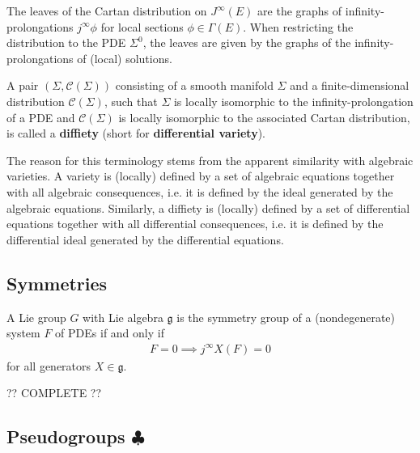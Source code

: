     \begin{property}[Diffiety]\label{var:diffiety}
        The leaves of the Cartan distribution on $J^\infty(E)$ are the graphs of infinity-prolongations $j^\infty\phi$ for local sections $\phi\in\Gamma(E)$. When restricting the distribution to the PDE $\Sigma^0$, the leaves are given by the graphs of the infinity-prolongations of (local) solutions.

        A pair $(\Sigma,\mathcal{C}(\Sigma))$ consisting of a smooth manifold $\Sigma$ and a finite-dimensional distribution $\mathcal{C}(\Sigma)$, such that $\Sigma$ is locally isomorphic to the infinity-prolongation of a PDE and $\mathcal{C}(\Sigma)$ is locally isomorphic to the associated Cartan distribution, is called a \textbf{diffiety} (short for \textbf{differential variety}).
    \end{property}
    \begin{remark}
        The reason for this terminology stems from the apparent similarity with algebraic varieties. A variety is (locally) defined by a set of algebraic equations together with all algebraic consequences, i.e. it is defined by the ideal generated by the algebraic equations. Similarly, a diffiety is (locally) defined by a set of differential equations together with all differential consequences, i.e. it is defined by the differential ideal generated by the differential equations.
    \end{remark}

\subsection{Symmetries}

    \begin{property}
        A Lie group $G$ with Lie algebra $\mathfrak{g}$ is the symmetry group of a (nondegenerate) system $F$ of PDEs if and only if
        \begin{gather}
            F=0\implies j^\infty X(F)=0
        \end{gather}
        for all generators $X\in\mathfrak{g}$.
    \end{property}

    ?? COMPLETE ??

\subsection{\texorpdfstring{Pseudogroups $\clubsuit$}{Pseudogroups}}

